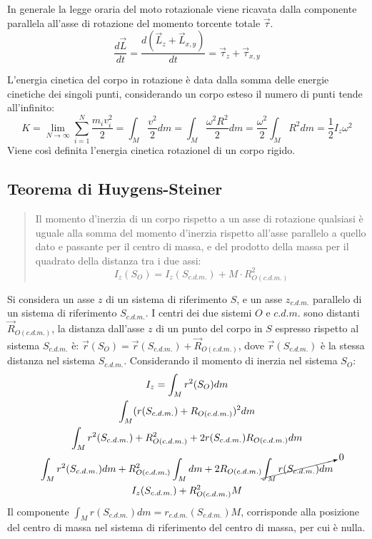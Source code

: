 \documentclass{article}
\numberwithin{equation}{subsection}
\begin{document}
In generale la legge oraria del moto rotazionale viene ricavata dalla componente parallela all'asse di rotazione del momento torcente totale $\vec{\tau}$. 
\begin{equation*}
    \displaystyle\frac{d\vec{L}}{dt}=\frac{d(\vec{L}_z+\vec{L}_{x,y})}{dt}=\vec{\tau}_z+\vec{\tau}_{x,y}
\end{equation*}


L'energia cinetica del corpo in rotazione è data dalla somma delle energie 
cinetiche dei singoli punti, considerando un corpo esteso il 
numero di punti tende all'infinito:
\begin{equation}
    K=\displaystyle\lim_{N\to\infty}\sum_{i=1}^{N}\frac{m_iv_i^2}{2}=\int_M\frac{v^2}{2}dm=\int_M\frac{\omega^2R^2}{2}dm=\frac{\omega^2}{2}\int_M R^2dm=\frac{1}{2}I_z\omega^2
\end{equation}
Viene così definita l'energia cinetica rotazionel di un corpo rigido. 

\subsection{Teorema di Huygens-Steiner}
\begin{quotation}
    Il momento d'inerzia di un corpo rispetto a un asse di 
    rotazione qualsiasi è uguale alla somma del momento d'inerzia rispetto all'asse parallelo a quello dato e 
    passante per il centro di massa, e del prodotto della massa 
    per il quadrato della distanza tra i due assi:
    \begin{equation}
        I_z(S_O)=I_z(S_{c.d.m.})+M\cdot R^2_{O(c.d.m.)}
    \end{equation}
\end{quotation}
Si considera un asse $z$ di un sistema di riferimento $S$, e 
un asse $z_{c.d.m.}$ parallelo di un sistema di riferimento $S_{c.d.m.}$. 
I centri dei due sistemi $O$ e $c.d.m.$ sono distanti $\vec{R}_{O(c.d.m.)}$, 
la distanza dall'asse $z$ di un punto del corpo in $S$ espresso rispetto al 
sistema $S_{c.d.m.}$ è: $\vec{r}(S_O)=\vec{r}(S_{c.d.m.})+\vec{R}_{O(c.d.m.)}$,  
dove $\vec{r}(S_{c.d.m.})$ è la stessa distanza nel sistema $S_{c.d.m.}$. 
Considerando il momento di inerzia nel sistema $S_O$: 
\begin{gather*}
    I_z=\displaystyle\int_M {r}^2(S_O)dm\\
    \int_M({r}(S_{c.d.m.})+{R}_{O(c.d.m.)})^2dm\\
    \int_M r^2(S_{c.d.m.})+R_{O(c.d.m.)}^2+2r(S_{c.d.m.})R_{O(c.d.m.)}dm\\
    \int_M r^2(S_{c.d.m.})dm+R_{O(c.d.m.)}^2\int_M dm+2R_{O(c.d.m.)}\cancelto{0}{\int_Mr(S_{c.d.m.})dm}\\
    I_z(S_{c.d.m.})+R_{O(c.d.m.)}^2M
\end{gather*}
Il componente $\displaystyle\int_M r(S_{c.d.m.})dm=r_{c.d.m.}(S_{c.d.m.})M$, corrisponde alla posizione del centro di massa nel sistema di riferimento del centro di massa, per cui è nulla. 
\end{document}
